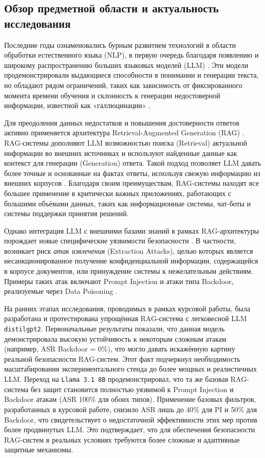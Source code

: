 \documentclass[12pt, a4paper]{article}
\theoremstyle{definition}
\theoremstyle{remark}
\begin{document}
\subsection{Обзор предметной области и актуальность исследования}
\label{sec:overview_relevance}

Последние годы ознаменовались бурным развитием технологий в области обработки естественного языка (NLP), в первую очередь благодаря появлению и широкому распространению больших языковых моделей (LLM) \cite{Brown2020FewShot, Lewis2020RAG}. Эти модели продемонстрировали выдающиеся способности в понимании и генерации текста, но обладают рядом ограничений, таких как зависимость от фиксированного момента времени обучения и склонность к генерации недостоверной информации, известной как «галлюцинации» \cite{Qi2024Survey}.

Для преодоления данных недостатков и повышения достоверности ответов активно применяется архитектура Retrieval-Augmented Generation (RAG) \cite{Lewis2020RAG}. RAG-системы дополняют LLM возможностью поиска (Retrieval) актуальной информации во внешних источниках и используют найденные данные как контекст для генерации (Generation) ответа. Такой подход позволяет LLM давать более точные и основанные на фактах ответы, используя свежую информацию из внешних корпусов \cite{Shao2024Survey}. Благодаря своим преимуществам, RAG-системы находят все большее применение в критически важных приложениях, работающих с большими объёмами данных, таких как информационные системы, чат-боты и системы поддержки принятия решений.

Однако интеграция LLM с внешними базами знаний в рамках RAG-архитектуры порождает новые специфические уязвимости безопасности \cite{Qi2024Survey}. В частности, возникает риск \textit{атак извлечения} (Extraction Attacks), целью которых является несанкционированное получение конфиденциальной информации, содержащейся в корпусе документов, или принуждение системы к нежелательным действиям. Примеры таких атак включают Prompt Injection и атаки типа Backdoor, реализуемые через Data Poisoning \cite{Qi2023PI, Peng2024BackdoorRAG}.

На ранних этапах исследования, проводимых в рамках курсовой работы, была разработана и протестирована упрощённая RAG-система с легковесной LLM \texttt{distilgpt2}. Первоначальные результаты показали, что данная модель демонстрировала высокую устойчивость к некоторым сложным атакам (например, ASR Backdoor = 0\%), что могло давать искажённую картину реальной безопасности RAG-систем. Этот факт подчеркнул необходимость масштабирования экспериментального стенда до более мощных и реалистичных LLM. Переход на \texttt{Llama~3.1~8B} продемонстрировал, что та же базовая RAG-система без защит становится полностью уязвимой к Prompt Injection и Backdoor атакам (ASR 100\% для обоих типов). Применение базовых фильтров, разработанных в курсовой работе, снизило ASR лишь до 40\% для PI и 50\% для Backdoor, что свидетельствует о недостаточной эффективности этих мер против более продвинутых LLM. Это подтверждает, что для обеспечения безопасности RAG-систем в реальных условиях требуются более сложные и адаптивные защитные механизмы.
\end{document}

